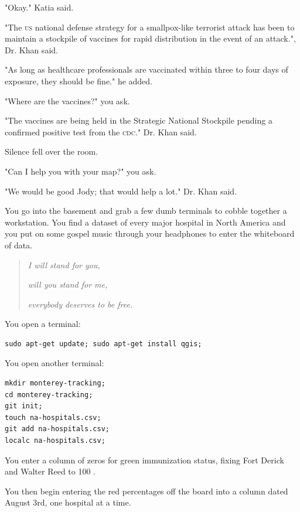 \documentclass[a5paper, symmetric]{tufte-book}
\newcommand*{\smallpercent}{\textsmaller[2]{\char"25} }
\begin{document}
"Okay." Katia said. 

"The \textsc{us} national defense strategy for a smallpox-like terrorist attack has been to maintain a stockpile of vaccines for rapid distribution in the event of an attack.", Dr. Khan said. 

"As long as healthcare professionals are vaccinated within three to four days of exposure, they should be fine." he added. 

"Where are the vaccines?" you ask. 

"The vaccines are being held in the Strategic National Stockpile pending a confirmed positive test from the \textsc{cdc}." Dr. Khan said. 

Silence fell over the room. 

"Can I help you with your map?" you ask. 

"We would be good Jody; that would help a lot." Dr. Khan said. 

You go into the basement and grab a few dumb terminals to cobble together a workstation. You find a dataset of every major hospital in North America and you put on some gospel music through your headphones to enter the whiteboard of data. 

\begin{quote}

\textit{I will stand for you,}

\textit{will you stand for me,}

\textit{everybody deserves to be free.}

\end{quote}

You open a terminal:

\begin{Verbatim}
sudo apt-get update; sudo apt-get install qgis;
\end{Verbatim}

You open another terminal:

\begin{Verbatim}
mkdir monterey-tracking;
cd monterey-tracking;
git init;
touch na-hospitals.csv;
git add na-hospitals.csv;
localc na-hospitals.csv;
\end{Verbatim}

 

You enter a column of zeros for green immunization status, fixing Fort Derick and Walter Reed to 100\smallpercent. 

You then begin entering the red percentages off the board into a column dated August 3rd, one hospital at a time.
\end{document}
